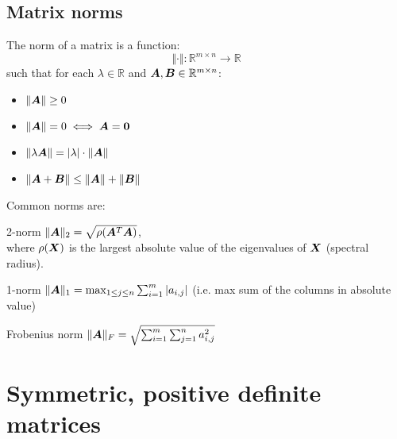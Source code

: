 \subsection{Matrix norms}
The norm of a matrix is a function: 
\begin{equation*}
    \Vert \cdot \Vert: \mathbb{R}^{m \times n} \rightarrow \mathbb{R}
\end{equation*}
such that for each $\lambda \in \mathbb{R}$ and ${\bm{A}}, {\bm{B}} \in \mathbb{R}^{m \times n}$:
\begin{itemize}
    \item $\Vert {\bm{A}} \Vert \geq 0$
    \item $\Vert {\bm{A}} \Vert = 0 \iff {\bm{A}} = {\bm{0}}$
    \item $\Vert \lambda {\bm{A}} \Vert = \vert \lambda \vert \cdot \Vert {\bm{A}} \Vert$
    \item $\Vert {\bm{A}} + {\bm{B}} \Vert \leq \Vert {\bm{A}} \Vert + \Vert {\bm{B}} \Vert$
\end{itemize}
%
Common norms are:
\begin{descriptionlist}
    \item[2-norm] 
        $\Vert {\bm{A}} \Vert_2 = \sqrt{ \rho({\bm{A}}^T{\bm{A}}) }$,\\
        where $\rho({\bm{X}})$ is the largest absolute value of the eigenvalues of ${\bm{X}}$ (spectral radius).
    
    \item[1-norm] $\Vert {\bm{A}} \Vert_1 = \max_{1 \leq j \leq n} \sum_{i=1}^{m} \vert a_{i,j} \vert$ (i.e. max sum of the columns in absolute value)
    
    \item[Frobenius norm] $\Vert {\bm{A}} \Vert_F = \sqrt{ \sum_{i=1}^{m} \sum_{j=1}^{n} a_{i,j}^2 }$
\end{descriptionlist}



\section{Symmetric, positive definite matrices}

